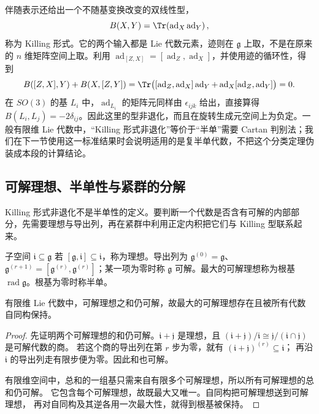 伴随表示还给出一个不随基变换改变的双线性型，
\begin{equation}
B(X,Y)=\Tr\!\left(\operatorname{ad}_X\operatorname{ad}_Y\right),
\label{eq:killing-form-lie}
\end{equation}
称为 Killing 形式。它的两个输入都是 Lie 代数元素，迹则在 $\mathfrak g$ 上取，不是在原来的 $n$ 维矩阵空间上取。利用 $\operatorname{ad}_{[Z,X]}=[\operatorname{ad}_Z,\operatorname{ad}_X]$，并使用迹的循环性，得到
\[
B([Z,X],Y)+B(X,[Z,Y])
=\Tr\bigl([\operatorname{ad}_Z,\operatorname{ad}_X]\operatorname{ad}_Y
+\operatorname{ad}_X[\operatorname{ad}_Z,\operatorname{ad}_Y]\bigr)=0.
\]
在 $SO(3)$ 的基 $L_i$ 中，$\operatorname{ad}_{L_i}$ 的矩阵元同样由 $\epsilon_{ijk}$ 给出，直接算得 $B(L_i,L_j)=-2\delta_{ij}$。因此这里的型非退化，而且在旋转生成元空间上为负定。一般有限维 Lie 代数中，“Killing 形式非退化”等价于“半单”需要 Cartan 判别法；我们在下一节使用这一标准结果时会说明适用的是复半单代数，不把这个分类定理伪装成本段的计算结论。

\subsection{可解理想、半单性与紧群的分解}

Killing 形式非退化不是半单性的定义。要判断一个代数是否含有可解的内部部分，先需要理想与导出列，再在紧群中利用正定内积把它们与 Killing 型联系起来。

\begin{definition}[理想、可解代数与根基]
子空间 $\mathfrak i\subseteq\mathfrak g$ 若 $[\mathfrak g,\mathfrak i]\subseteq\mathfrak i$，称为理想。导出列为 $\mathfrak g^{(0)}=\mathfrak g$、$\mathfrak g^{(r+1)}=[\mathfrak g^{(r)},\mathfrak g^{(r)}]$；某一项为零时称 $\mathfrak g$ 可解。最大的可解理想称为根基 $\operatorname{rad}\mathfrak g$。根基为零时称半单。
\end{definition}
\begin{lemma}[根基存在且唯一]
有限维 Lie 代数中，可解理想之和仍可解，故最大的可解理想存在且被所有代数自同构保持。
\end{lemma}
\begin{proof}
先证明两个可解理想的和仍可解。$\mathfrak i+\mathfrak j$ 是理想，且
$(\mathfrak i+\mathfrak j)/\mathfrak i\cong\mathfrak j/(\mathfrak i\cap\mathfrak j)$ 是可解代数的商。
若这个商的导出列在第 $r$ 步为零，就有 $(\mathfrak i+\mathfrak j)^{(r)}\subseteq\mathfrak i$；
再沿 $\mathfrak i$ 的导出列走有限步便为零。因此和也可解。

有限维空间中，总和的一组基只需来自有限多个可解理想，所以所有可解理想的总和仍可解。
它包含每个可解理想，故既最大又唯一。自同构把可解理想送到可解理想，
再对自同构及其逆各用一次最大性，就得到根基被保持。
\end{proof}

